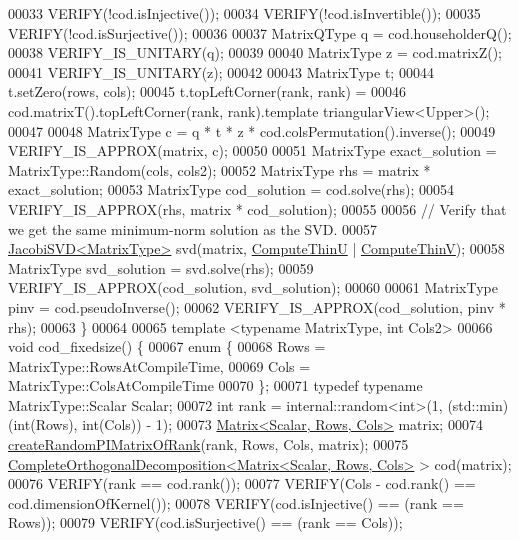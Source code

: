 \begin{DoxyCode}
00033   VERIFY(!cod.isInjective());
00034   VERIFY(!cod.isInvertible());
00035   VERIFY(!cod.isSurjective());
00036 
00037   MatrixQType q = cod.householderQ();
00038   VERIFY\_IS\_UNITARY(q);
00039 
00040   MatrixType z = cod.matrixZ();
00041   VERIFY\_IS\_UNITARY(z);
00042 
00043   MatrixType t;
00044   t.setZero(rows, cols);
00045   t.topLeftCorner(rank, rank) =
00046       cod.matrixT().topLeftCorner(rank, rank).template triangularView<Upper>();
00047 
00048   MatrixType c = q * t * z * cod.colsPermutation().inverse();
00049   VERIFY\_IS\_APPROX(matrix, c);
00050 
00051   MatrixType exact\_solution = MatrixType::Random(cols, cols2);
00052   MatrixType rhs = matrix * exact\_solution;
00053   MatrixType cod\_solution = cod.solve(rhs);
00054   VERIFY\_IS\_APPROX(rhs, matrix * cod\_solution);
00055 
00056   \textcolor{comment}{// Verify that we get the same minimum-norm solution as the SVD.}
00057   \hyperlink{group___s_v_d___module_class_eigen_1_1_jacobi_s_v_d}{JacobiSVD<MatrixType>} svd(matrix, \hyperlink{group__enums_ggae3e239fb70022eb8747994cf5d68b4a9af8c742a1aa87773e165eae406c9ccaf8}{ComputeThinU} | 
      \hyperlink{group__enums_ggae3e239fb70022eb8747994cf5d68b4a9a1055e53fa95c8ae04a07ebb72cfafd95}{ComputeThinV});
00058   MatrixType svd\_solution = svd.solve(rhs);
00059   VERIFY\_IS\_APPROX(cod\_solution, svd\_solution);
00060 
00061   MatrixType pinv = cod.pseudoInverse();
00062   VERIFY\_IS\_APPROX(cod\_solution, pinv * rhs);
00063 \}
00064 
00065 \textcolor{keyword}{template} <\textcolor{keyword}{typename} MatrixType, \textcolor{keywordtype}{int} Cols2>
00066 \textcolor{keywordtype}{void} cod\_fixedsize() \{
00067   \textcolor{keyword}{enum} \{
00068     Rows = MatrixType::RowsAtCompileTime,
00069     Cols = MatrixType::ColsAtCompileTime
00070   \};
00071   \textcolor{keyword}{typedef} \textcolor{keyword}{typename} MatrixType::Scalar Scalar;
00072   \textcolor{keywordtype}{int} rank = internal::random<int>(1, (std::min)(\textcolor{keywordtype}{int}(Rows), int(Cols)) - 1);
00073   \hyperlink{group___core___module_class_eigen_1_1_matrix}{Matrix<Scalar, Rows, Cols>} matrix;
00074   \hyperlink{namespace_eigen_a0d9a7ddcee5c7c8defaba3628455efb2}{createRandomPIMatrixOfRank}(rank, Rows, Cols, matrix);
00075   \hyperlink{group___q_r___module_class_eigen_1_1_complete_orthogonal_decomposition}{CompleteOrthogonalDecomposition<Matrix<Scalar, Rows, Cols>}
       > cod(matrix);
00076   VERIFY(rank == cod.rank());
00077   VERIFY(Cols - cod.rank() == cod.dimensionOfKernel());
00078   VERIFY(cod.isInjective() == (rank == Rows));
00079   VERIFY(cod.isSurjective() == (rank == Cols));

\end{DoxyCode}
